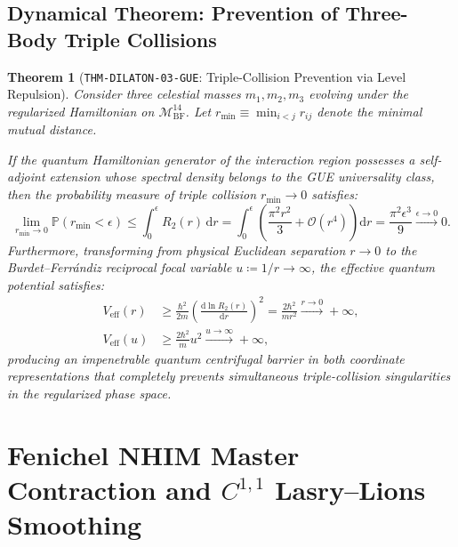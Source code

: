 \documentclass[11pt,a4paper,reqno]{article}
\theoremstyle{plain}
\newtheorem{theorem}{Theorem}[section]
\theoremstyle{definition}
\theoremstyle{remark}
\numberwithin{equation}{section}
\newcommand{\Mbf}{\mathcal{M}_{\mathrm{BF}}^{14}}
\providecommand{\diff}{\mathrm{d}}
\begin{document}
\subsection{Dynamical Theorem: Prevention of Three-Body Triple Collisions}
\label{subsec:triple_collision_avoidance}
\begin{theorem}[\texttt{THM-DILATON-03-GUE}: Triple-Collision Prevention via Level Repulsion]
\label{thm:triple_collision_avoidance}
Consider three celestial masses $m_1, m_2, m_3$ evolving under the regularized Hamiltonian on $\Mbf$. Let $r_{\mathrm{min}} \equiv \min_{i < j} r_{ij}$ denote the minimal mutual distance.

If the quantum Hamiltonian generator of the interaction region possesses a self-adjoint extension whose spectral density belongs to the GUE universality class, then the probability measure of triple collision $r_{\mathrm{min}} \to 0$ satisfies:
\begin{equation}
  \lim_{r_{\mathrm{min}} \to 0} \mathbb{P}(r_{\mathrm{min}} < \epsilon) \le \int_0^\epsilon R_2(r) \, \diff r = \int_0^\epsilon \left( \frac{\pi^2 r^2}{3} + \mathcal{O}(r^4) \right) \diff r = \frac{\pi^2 \epsilon^3}{9} \xrightarrow{\epsilon \to 0} 0.
  \label{eq:collision_avoidance}
\end{equation}
Furthermore, transforming from physical Euclidean separation $r \to 0$ to the Burdet--Ferr\'andiz reciprocal focal variable $u \coloneqq 1/r \to \infty$, the effective quantum potential satisfies:
\begin{align}
  V_{\mathrm{eff}}(r) &\ge \frac{\hbar^2}{2 m} \left( \frac{\diff \ln R_2(r)}{\diff r} \right)^2 = \frac{2 \hbar^2}{m r^2} \xrightarrow{r \to 0} +\infty, \label{eq:centrifugal_barrier_r} \\
  V_{\mathrm{eff}}(u) &\ge \frac{2 \hbar^2}{m} u^2 \xrightarrow{u \to \infty} +\infty, \label{eq:centrifugal_barrier_u}
\end{align}
producing an impenetrable quantum centrifugal barrier in both coordinate representations that completely prevents simultaneous triple-collision singularities in the regularized phase space.
\end{theorem}

\section{Fenichel NHIM Master Contraction and \texorpdfstring{$C^{1,1}$}{C\^{}(1,1)} Lasry--Lions Smoothing}
\label{sec:fenichel_lasry_lions}
\end{document}
